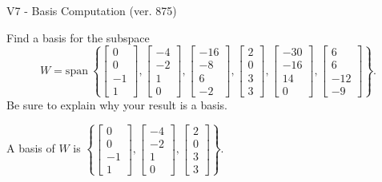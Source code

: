 \begin{exercise}
  \begin{exerciseTitle}V7 - Basis Computation (ver. 875)\end{exerciseTitle}
  \begin{exerciseStatement}
    Find a basis for the subspace 
\[W=\mathrm{span}\ \left\{\left[\begin{array}{r}
0 \\
0 \\
-1 \\
1
\end{array}\right] , \left[\begin{array}{r}
-4 \\
-2 \\
1 \\
0
\end{array}\right] , \left[\begin{array}{r}
-16 \\
-8 \\
6 \\
-2
\end{array}\right] , \left[\begin{array}{r}
2 \\
0 \\
3 \\
3
\end{array}\right] , \left[\begin{array}{r}
-30 \\
-16 \\
14 \\
0
\end{array}\right] , \left[\begin{array}{r}
6 \\
6 \\
-12 \\
-9
\end{array}\right]\right\}.\]
 Be sure to explain why your result is a basis.


  \end{exerciseStatement}
  \begin{exerciseAnswer}
   A basis of \(W\) is  \(\left\{\left[\begin{array}{r}
0 \\
0 \\
-1 \\
1
\end{array}\right] , \left[\begin{array}{r}
-4 \\
-2 \\
1 \\
0
\end{array}\right] , \left[\begin{array}{r}
2 \\
0 \\
3 \\
3
\end{array}\right]\right\}\).
  


  \end{exerciseAnswer}
\end{exercise}